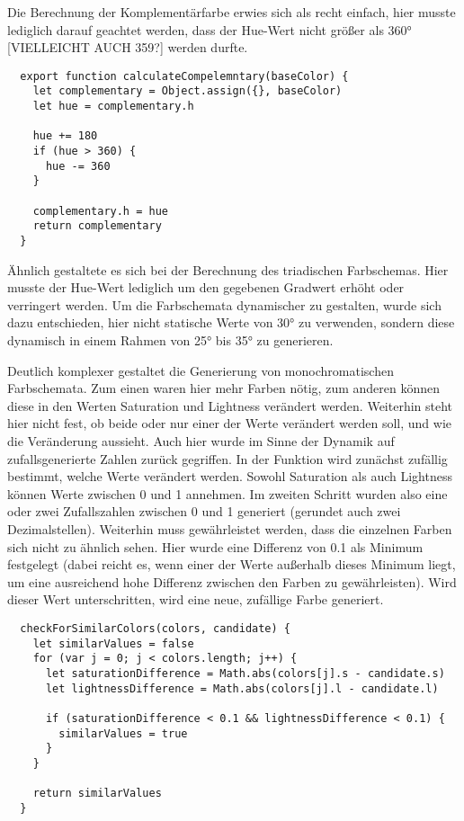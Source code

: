 Die Berechnung der Komplementärfarbe erwies sich als recht einfach, hier musste lediglich darauf geachtet werden, dass der Hue-Wert nicht größer als 360° [VIELLEICHT AUCH 359?] werden durfte.


\begin{lstlisting}
  export function calculateCompelemntary(baseColor) {
    let complementary = Object.assign({}, baseColor)
    let hue = complementary.h

    hue += 180
    if (hue > 360) {
      hue -= 360
    }

    complementary.h = hue
    return complementary
  }
\end{lstlisting}

Ähnlich gestaltete es sich bei der Berechnung des triadischen Farbschemas. Hier musste der Hue-Wert lediglich um den gegebenen Gradwert erhöht oder verringert werden. Um die Farbschemata dynamischer zu gestalten, wurde sich dazu entschieden, hier nicht statische Werte von 30° zu verwenden, sondern diese dynamisch in einem Rahmen von 25° bis 35° zu generieren.

Deutlich komplexer gestaltet die Generierung von monochromatischen Farbschemata. Zum einen waren hier mehr Farben nötig, zum anderen können diese in den Werten Saturation und Lightness verändert werden. Weiterhin steht hier nicht fest, ob beide oder nur einer der Werte verändert werden soll, und wie die Veränderung aussieht. Auch hier wurde im Sinne der Dynamik auf zufallsgenerierte Zahlen zurück gegriffen.
In der Funktion wird zunächst zufällig bestimmt, welche Werte verändert werden. Sowohl Saturation als auch Lightness können Werte zwischen 0 und 1 annehmen. Im zweiten Schritt wurden also eine oder zwei Zufallszahlen zwischen 0 und 1 generiert (gerundet auch zwei Dezimalstellen).
Weiterhin muss gewährleistet werden, dass die einzelnen Farben sich nicht zu ähnlich sehen. Hier wurde eine Differenz von 0.1 als Minimum festgelegt (dabei reicht es, wenn einer der Werte außerhalb dieses Minimum liegt, um eine ausreichend hohe Differenz zwischen den Farben zu gewährleisten). Wird dieser Wert unterschritten, wird eine neue, zufällige Farbe generiert.

\begin{lstlisting}
  checkForSimilarColors(colors, candidate) {
    let similarValues = false
    for (var j = 0; j < colors.length; j++) {
      let saturationDifference = Math.abs(colors[j].s - candidate.s)
      let lightnessDifference = Math.abs(colors[j].l - candidate.l)

      if (saturationDifference < 0.1 && lightnessDifference < 0.1) {
        similarValues = true
      }
    }

    return similarValues
  }
\end{lstlisting}

